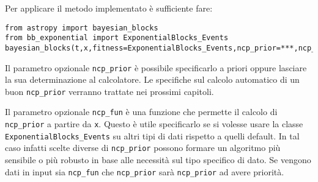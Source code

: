 \documentclass[10pt,a4paper]{report}
\begin{document}
Per applicare il metodo implementato è sufficiente fare:
\begin{verbatim}
from astropy import bayesian_blocks
from bb_exponential import ExponentialBlocks_Events
bayesian_blocks(t,x,fitness=ExponentialBlocks_Events,ncp_prior=***,ncp_fun=***)
\end{verbatim}
Il parametro opzionale \texttt{ncp\_prior} è possibile specificarlo a priori oppure lasciare la sua determinazione al calcolatore. Le specifiche sul calcolo automatico di un buon \texttt{ncp\_prior} verranno trattate nei prossimi capitoli.

Il parametro opzionale \texttt{ncp\_fun} è una funzione che permette il calcolo di \texttt{ncp\_prior} a partire da \texttt{x}. Questo è utile specificarlo se si volesse usare la classe \texttt{ExponentialBlocks\_Events} su altri tipi di dati rispetto a quelli default. In tal caso infatti scelte diverse di \texttt{ncp\_prior} possono formare un algoritmo più sensibile o più robusto in base alle necessità sul tipo specifico di dato. Se vengono dati in input sia \texttt{ncp\_fun} che \texttt{ncp\_prior} sarà \texttt{ncp\_prior} ad avere priorità.
\end{document}
